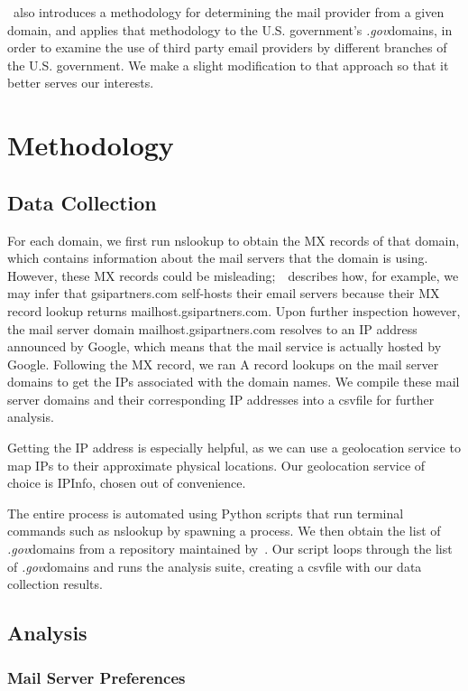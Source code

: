 \documentclass{hotnets21}
\newcommand{\dotgov}{\textit{.gov}\space}
\newcommand{\csv}{csv\space}
\begin{document}
\cite{liu}~also introduces a methodology for determining the mail provider from a given domain, and applies that methodology to the U.S. government’s \dotgov domains, in order to examine the use of third party email providers by different branches of the U.S. government.
We make a slight modification to that approach so that it better serves our interests.

\section{Methodology}

\subsection{Data Collection}

For each domain, we first run nslookup to obtain the MX records of that domain, which contains information about the mail servers that the domain is using.
However, these MX records could be misleading;~\cite{liu}~describes how, for example, we may infer that gsipartners.com self-hosts their email servers because their MX record lookup returns mailhost.gsipartners.com.
Upon further inspection however, the mail server domain mailhost.gsipartners.com resolves to an IP address announced by Google, which means that the mail service is actually hosted by Google.
Following the MX record, we ran A record lookups on the mail server domains to get the IPs associated with the domain names.
We compile these mail server domains and their corresponding IP addresses into a \csv file for further analysis.

Getting the IP address is especially helpful, as we can use a geolocation service to map IPs to their approximate physical locations.
Our geolocation service of choice is IPInfo, chosen out of convenience. 

The entire process is automated using Python scripts that run terminal commands such as nslookup by spawning a process.
We then obtain the list of \dotgov domains from a repository maintained by~\cite{cisadomains}.
Our script loops through the list of \dotgov domains and runs the analysis suite, creating a \csv file with our data collection results.

\subsection{Analysis}

\subsubsection{Mail Server Preferences}
\end{document}
